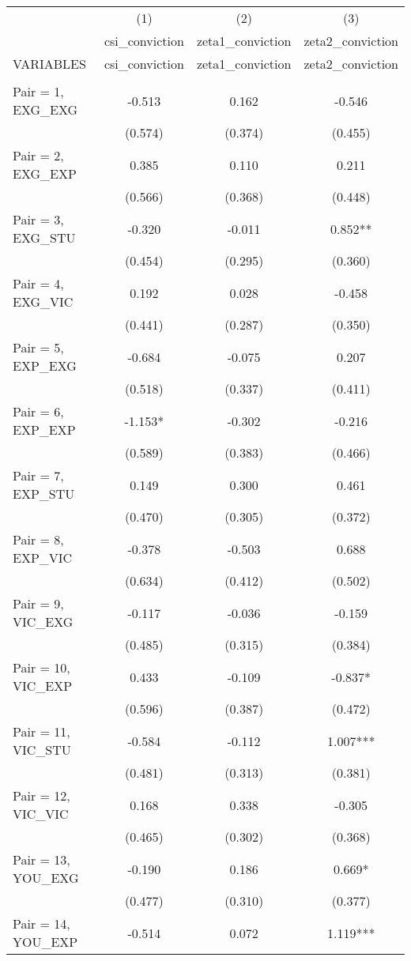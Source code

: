 \documentclass[]{article}
\begin{document}
\begin{tabular}{lccc} \hline
 & (1) & (2) & (3) \\
 & csi\_conviction & zeta1\_conviction & zeta2\_conviction \\
VARIABLES & csi\_conviction & zeta1\_conviction & zeta2\_conviction \\ \hline
 &  &  &  \\
Pair = 1, EXG\_EXG & -0.513 & 0.162 & -0.546 \\
 & (0.574) & (0.374) & (0.455) \\
Pair = 2, EXG\_EXP & 0.385 & 0.110 & 0.211 \\
 & (0.566) & (0.368) & (0.448) \\
Pair = 3, EXG\_STU & -0.320 & -0.011 & 0.852** \\
 & (0.454) & (0.295) & (0.360) \\
Pair = 4, EXG\_VIC & 0.192 & 0.028 & -0.458 \\
 & (0.441) & (0.287) & (0.350) \\
Pair = 5, EXP\_EXG & -0.684 & -0.075 & 0.207 \\
 & (0.518) & (0.337) & (0.411) \\
Pair = 6, EXP\_EXP & -1.153* & -0.302 & -0.216 \\
 & (0.589) & (0.383) & (0.466) \\
Pair = 7, EXP\_STU & 0.149 & 0.300 & 0.461 \\
 & (0.470) & (0.305) & (0.372) \\
Pair = 8, EXP\_VIC & -0.378 & -0.503 & 0.688 \\
 & (0.634) & (0.412) & (0.502) \\
Pair = 9, VIC\_EXG & -0.117 & -0.036 & -0.159 \\
 & (0.485) & (0.315) & (0.384) \\
Pair = 10, VIC\_EXP & 0.433 & -0.109 & -0.837* \\
 & (0.596) & (0.387) & (0.472) \\
Pair = 11, VIC\_STU & -0.584 & -0.112 & 1.007*** \\
 & (0.481) & (0.313) & (0.381) \\
Pair = 12, VIC\_VIC & 0.168 & 0.338 & -0.305 \\
 & (0.465) & (0.302) & (0.368) \\
Pair = 13, YOU\_EXG & -0.190 & 0.186 & 0.669* \\
 & (0.477) & (0.310) & (0.377) \\
Pair = 14, YOU\_EXP & -0.514 & 0.072 & 1.119*** \\

\end{tabular}
\end{document}
